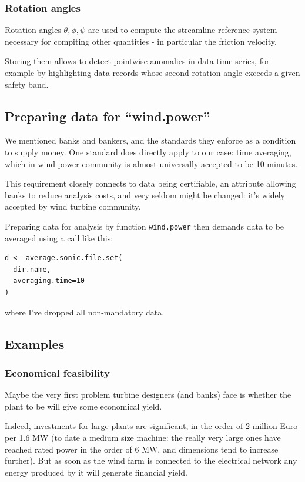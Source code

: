 \documentclass[a4paper,10pt]{book}
\begin{document}
\subsubsection{Rotation angles}

Rotation angles $\theta, \phi, \psi$ are used to compute the streamline reference system necessary for compiting other quantities - in particular the friction velocity.

Storing them allows to detect pointwise anomalies in data time series, for example by highlighting data records whose second rotation angle exceeds a given safety band.

\subsection{Preparing data for ``wind.power''}

We mentioned banks and bankers, and the standards they enforce as a condition to supply money. One standard does directly apply to our case: time averaging, which in wind power community is almost universally accepted to be 10 minutes.

This requirement closely connects to data being certifiable, an attribute allowing banks to reduce analysis costs, and very seldom might be changed: it's widely accepted by wind turbine community.

Preparing data for analysis by function \verb|wind.power| then demands data to be averaged using a call like this:

\begin{verbatim}
d <- average.sonic.file.set(
  dir.name,
  averaging.time=10
)
\end{verbatim}

\noindent where I've dropped all non-mandatory data.

\subsection{Examples}
\subsubsection{Economical feasibility}

Maybe the very first problem turbine designers (and banks) face is whether the plant to be will give some economical yield.

Indeed, investments for large plants are significant, in the order of 2 million Euro per 1.6 MW (to date a medium size machine: the really very large ones have reached rated power in the order of 6 MW, and dimensions tend to increase further). But as soon as the wind farm is connected to the electrical network any energy produced by it will generate financial yield.
\end{document}
